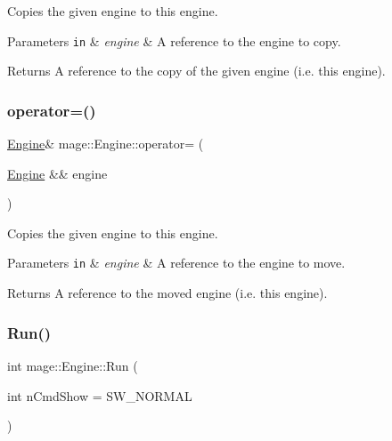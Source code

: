 Copies the given engine to this engine.


\begin{DoxyParams}[1]{Parameters}
\mbox{\tt in}  & {\em engine} & A reference to the engine to copy. \\
\hline
\end{DoxyParams}
\begin{DoxyReturn}{Returns}
A reference to the copy of the given engine (i.\+e. this engine). 
\end{DoxyReturn}
\hypertarget{classmage_1_1_engine_a22607a263e0be5e179cc0e4bf13b18f7}{}\label{classmage_1_1_engine_a22607a263e0be5e179cc0e4bf13b18f7} 
\subsubsection{\texorpdfstring{operator=()}{operator=()}\hspace{0.1cm}{\footnotesize\ttfamily [2/2]}}
{\footnotesize\ttfamily \hyperlink{classmage_1_1_engine}{Engine}\& mage\+::\+Engine\+::operator= (\begin{DoxyParamCaption}\item[{\hyperlink{classmage_1_1_engine}{Engine} \&\&}]{engine }\end{DoxyParamCaption})\hspace{0.3cm}{\ttfamily [delete]}}

Copies the given engine to this engine.


\begin{DoxyParams}[1]{Parameters}
\mbox{\tt in}  & {\em engine} & A reference to the engine to move. \\
\hline
\end{DoxyParams}
\begin{DoxyReturn}{Returns}
A reference to the moved engine (i.\+e. this engine). 
\end{DoxyReturn}
\hypertarget{classmage_1_1_engine_acc09edf2a10338566926f6c6129c8746}{}\label{classmage_1_1_engine_acc09edf2a10338566926f6c6129c8746} 
\subsubsection{\texorpdfstring{Run()}{Run()}}
{\footnotesize\ttfamily int mage\+::\+Engine\+::\+Run (\begin{DoxyParamCaption}\item[{int}]{n\+Cmd\+Show = {\ttfamily SW\+\_\+NORMAL} }\end{DoxyParamCaption})}

